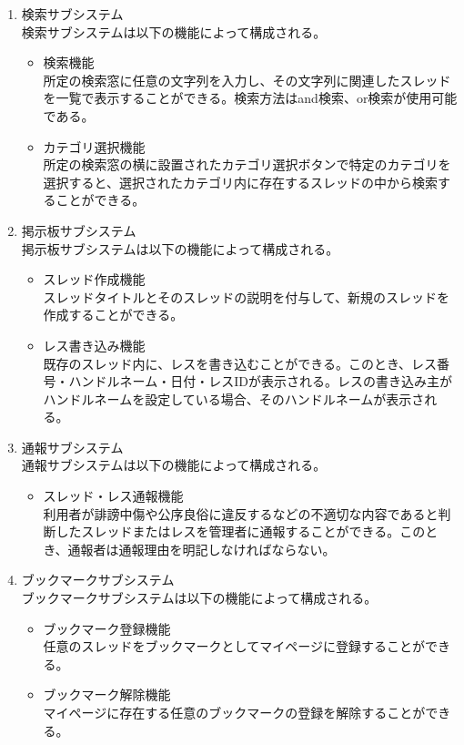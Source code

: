 \documentclass[a4j]{jarticle}
\begin{document}
\begin{enumerate}
  \item 検索サブシステム\\
  検索サブシステムは以下の機能によって構成される。
  \begin{itemize}
    \item 検索機能\\
    所定の検索窓に任意の文字列を入力し、その文字列に関連したスレッドを一覧で表示することができる。検索方法はand検索、or検索が使用可能である。
    \item カテゴリ選択機能\\
    所定の検索窓の横に設置されたカテゴリ選択ボタンで特定のカテゴリを選択すると、選択されたカテゴリ内に存在するスレッドの中から検索することができる。
  \end{itemize}

  \item 掲示板サブシステム\\
  掲示板サブシステムは以下の機能によって構成される。
  \begin{itemize}
    \item スレッド作成機能\\
    スレッドタイトルとそのスレッドの説明を付与して、新規のスレッドを作成することができる。
    \item レス書き込み機能\\
    既存のスレッド内に、レスを書き込むことができる。このとき、レス番号・ハンドルネーム・日付・レスIDが表示される。レスの書き込み主がハンドルネームを設定している場合、そのハンドルネームが表示される。
  \end{itemize}

  \item 通報サブシステム\\
  通報サブシステムは以下の機能によって構成される。
  \begin{itemize}
    \item スレッド・レス通報機能\\
    利用者が誹謗中傷や公序良俗に違反するなどの不適切な内容であると判断したスレッドまたはレスを管理者に通報することができる。このとき、通報者は通報理由を明記しなければならない。
  \end{itemize}

  \item ブックマークサブシステム\\
  ブックマークサブシステムは以下の機能によって構成される。
  \begin{itemize}
    \item ブックマーク登録機能\\
    任意のスレッドをブックマークとしてマイページに登録することができる。
    \item ブックマーク解除機能\\
    マイページに存在する任意のブックマークの登録を解除することができる。
  \end{itemize}


\end{enumerate}
\end{document}
